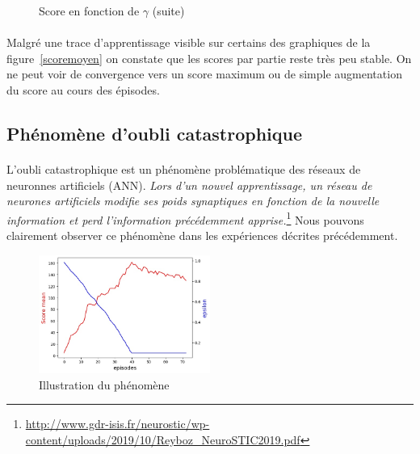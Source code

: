 \documentclass[12pt,oneside,a4paper]{article}
\begin{document}
\begin{figure}[hbt!]
{        }
        \hspace{0mm}
        \caption{Score en fonction de $\gamma$ (suite)}
    \end{figure}

    \paragraph{}
    Malgré une trace d'apprentissage visible sur certains des graphiques de la figure~\ref{scoremoyen} on constate que les scores par partie
    reste très peu stable. On ne peut voir de convergence vers un score maximum ou de simple augmentation du score au cours
    des épisodes.
    \newpage

    \subsection{Phénomène d'oubli catastrophique}

    \paragraph{}
    L'oubli catastrophique est un phénomène problématique des réseaux de neuronnes artificiels (ANN).
    \textit{Lors d’un nouvel apprentissage, un réseau
    de neurones artificiels modifie ses poids synaptiques en fonction
    de la nouvelle information et perd l’information précédemment
    apprise.}\footnote{\url{http://www.gdr-isis.fr/neurostic/wp-content/uploads/2019/10/Reyboz_NeuroSTIC2019.pdf}}
    Nous pouvons clairement observer ce phénomène dans les expériences décrites précédemment.
    \begin{figure}[h]
        \centering
        \includegraphics[width=0.5\textwidth] {./catastrophic_forgetting.jpg}
        \caption{Illustration du phénomène}
    \end{figure}
\end{document}
